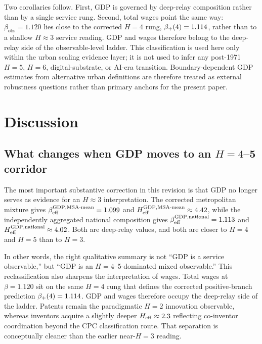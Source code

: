 Two corollaries follow. First, GDP is governed by deep-relay composition rather than by a single service rung. Second, total wages point the same way: \(\beta_{\mathrm{obs}}=1.120\) lies close to the corrected \(H=4\) rung, \(\beta_+\!\left(4\right)=1.114\), rather than to a shallow \(H\approx 3\) service reading. GDP and wages therefore belong to the deep-relay side of the observable-level ladder. This classification is used here only within the urban scaling evidence layer; it is not used to infer any post-1971 \(H=5\), \(H=6\), digital-substrate, or AI-era transition. Boundary-dependent GDP estimates from alternative urban definitions are therefore treated as external robustness questions rather than primary anchors for the present paper.

\section{Discussion}

\subsection{What changes when GDP moves to an \(H=4\)--5 corridor}

The most important substantive correction in this revision is that GDP no
longer serves as evidence for an \(H\approx 3\) interpretation.
The corrected metropolitan mixture gives
\(\beta_{\mathrm{eff}}^{\mathrm{GDP,MSA\text{-}mean}}=1.099\) and
\(H_{\mathrm{eff}}^{\mathrm{GDP,MSA\text{-}mean}}\approx 4.42\), while the independently
aggregated national composition gives
\(\beta_{\mathrm{eff}}^{\mathrm{GDP,national}}=1.113\) and
\(H_{\mathrm{eff}}^{\mathrm{GDP,national}}\approx 4.02\).
Both are deep-relay values, and both are closer to \(H=4\) and \(H=5\) than to
\(H=3\).

In other words, the right qualitative summary is not ``GDP is a service
observable,'' but ``GDP is an \(H=4\)--5-dominated mixed observable.''
This reclassification also sharpens the interpretation of wages.
Total wages at \(\beta=1.120\) sit on the same \(H=4\) rung that defines the
corrected positive-branch prediction \(\beta_+\!\left(4\right)=1.114\).
GDP and wages therefore occupy the deep-relay side of the ladder. Patents
remain the paradigmatic \(H=2\) innovation observable, whereas inventors
acquire a slightly deeper \(H_{\mathrm{eff}}\approx 2.3\) reflecting co-inventor
coordination beyond the CPC classification route.
That separation is conceptually cleaner than the earlier near-\(H=3\) reading.

